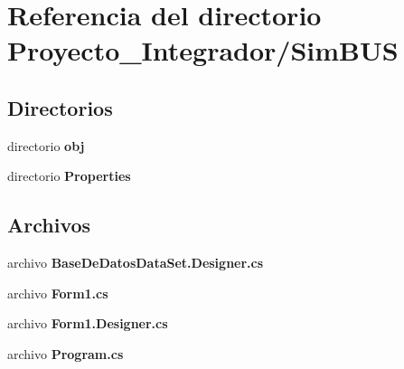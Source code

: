 \section{Referencia del directorio Proyecto\-\_\-\-Integrador/\-Sim\-B\-U\-S}
\label{dir_b8cf7897ae06ebf5a368acf362f065cb}
\subsection*{Directorios}
\begin{DoxyCompactItemize}
\item 
directorio {\bf obj}
\item 
directorio {\bf Properties}
\end{DoxyCompactItemize}
\subsection*{Archivos}
\begin{DoxyCompactItemize}
\item 
archivo {\bf Base\-De\-Datos\-Data\-Set.\-Designer.\-cs}
\item 
archivo {\bf Form1.\-cs}
\item 
archivo {\bf Form1.\-Designer.\-cs}
\item 
archivo {\bf Program.\-cs}
\end{DoxyCompactItemize}
